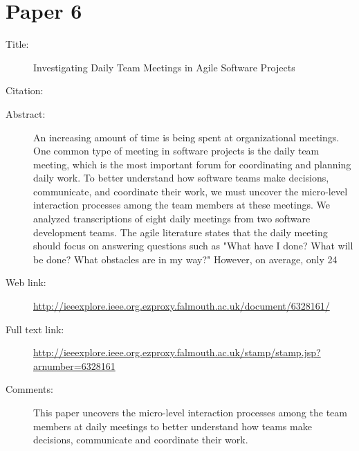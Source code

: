 \documentclass{scrartcl}
\begin{document}
\section*{Paper 6}
\begin{description}
\item[Title:] Investigating Daily Team Meetings in Agile Software Projects
\item[Citation:] \cite{SoftwareProjects}
\item[Abstract:] An increasing amount of time is being spent at organizational meetings. One common type of meeting in software projects is the daily team meeting, which is the most important forum for coordinating and planning daily work. To better understand how software teams make decisions, communicate, and coordinate their work, we must uncover the micro-level interaction processes among the team members at these meetings. We analyzed transcriptions of eight daily meetings from two software development teams. The agile literature states that the daily meeting should focus on answering questions such as "What have I done? What will be done? What obstacles are in my way?" However, on average, only 24%
\item[Web link:] \url{http://ieeexplore.ieee.org.ezproxy.falmouth.ac.uk/document/6328161/}
\item[Full text link:] \url{http://ieeexplore.ieee.org.ezproxy.falmouth.ac.uk/stamp/stamp.jsp?arnumber=6328161}
\item[Comments:] This paper uncovers the micro-level interaction processes among the team members at daily meetings to better understand how teams make decisions, communicate and coordinate their work.
\end{description}



\end{document}
